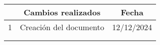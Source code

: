 
\begin{table}[H]
\centering  
\begin{tabular}{|l|l|l|}
\hline
\rowcolor[HTML]{EFEFEF} 
\multicolumn{1}{|c|}{\cellcolor[HTML]{EFEFEF}\textbf{Revisión}} & \multicolumn{1}{c|}{\cellcolor[HTML]{EFEFEF}\textbf{Cambios realizados}} & \multicolumn{1}{c|}{\cellcolor[HTML]{EFEFEF}\textbf{Fecha}} \\ \hline
\multicolumn{1}{|c|}{1}                                         & Creación del documento \hspace{5cm}                                      & 12/12/2024                                                  \\ \hline
                                                                &                                                                          &                                                             \\ \hline
                                                                &                                                                          &                                                             \\ \hline
\end{tabular}
\end{table}

